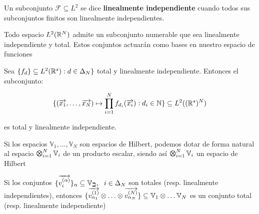 \begin{definicion}

    Un subconjunto $\mathcal{F} \subseteq L^2$ se dice \textbf{linealmente independiente} cuando todos sus subconjuntos finitos son linealmente independientes.

\end{definicion}

\begin{proposicion}
    Todo espacio $L^2(\mathbb{R}^N)$ admite un subconjunto numerable que sea linealmente independiente y total. Estos conjuntos actuarán como bases en nuestro espacio de funciones
\end{proposicion}

\begin{proposicion}
    Sea $\{f_d\} \subseteq L^2(\mathbb{R}^s): d \in \Delta_{N} \}$ total y linealmente independiente. Entonces el subconjunto:

    \begin{equation}
        \{ (\overrightarrow{x_1}, \ldots, \overrightarrow{x_N}) \mapsto \prod_{i = 1}^N f_{d_i}(\overrightarrow{x_i}): d_i \in \mathbb{N} \} \subseteq L^2((\mathbb{R}^s)^N)
    \end{equation}

    es total y linealmente independiente.
\end{proposicion}

\begin{proposicion}

    Si los espacios $\mathbb{V}_1, \ldots, \mathbb{V}_N$ son espacios de Hilbert, podemos dotar de forma natural al espacio $\MediumOtimes_{i = 1}^N \mathbb{V}_i$ de un producto escalar, siendo así $\MediumOtimes_{i = 1}^N \mathbb{V}_i$ un espacio de Hilbert

\end{proposicion}

\begin{proposicion}
    Si los conjuntos $\{\overrightarrow{v_i^{(\alpha)}}\}_{\alpha} \subseteq \mathbb{V_i}, \ \  i \in \Delta_{N}$ son totales (resp. linealmente independientes), entonces $\{ \overrightarrow{v^{(1)}_{\alpha_1}} \otimes \ldots \otimes  \overrightarrow{v^{(N)}_{\alpha_N}}  \} \subseteq \mathbb{V}_1 \otimes \ldots \mathbb{V}_N$ es un conjunto total (resp. linealmente independiente)
\end{proposicion}


